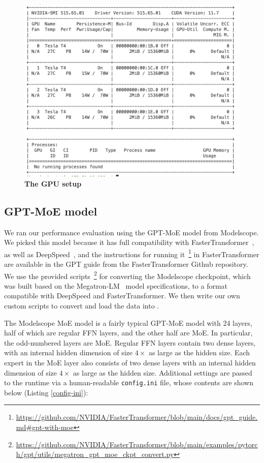 \begin{figure}[H]
    \centering
    \includegraphics[width=\linewidth]{figures/nvidia-smi.png}
    \caption{\textbf{The GPU setup}}
    \label{fig:gpu-setup}
\end{figure}

\subsection{GPT-MoE model}
We ran our performance evaluation using the GPT-MoE model from Modelscope. We picked this model because it has full compatibility with FasterTransformer~\cite{faster_transformer}, as well as DeepSpeed~\cite{deepspeed-moe}, and the instructions for running it~\footnote{\url{https://github.com/NVIDIA/FasterTransformer/blob/main/docs/gpt\_guide.md\#gpt-with-moe}} in FasterTransformer are available in the GPT guide from the FasterTransformer Github repository. We use the provided scripts~\footnote{\url{https://github.com/NVIDIA/FasterTransformer/blob/main/examples/pytorch/gpt/utils/megatron\_gpt\_moe\_ckpt\_convert.py}} for converting the Modelscope checkpoint, which was built based on the Megatron-LM~\cite{megatron-lm} model specifications, to a format compatible with DeepSpeed and FasterTransformer. We then write our own custom scripts to convert and load the data into \Project.

The Modelscope MoE model is a fairly typical GPT-MoE model with 24 layers, half of which are regular FFN layers, and the other half are MoE. In particular, the odd-numbered layers are MoE. Regular FFN layers contain two dense layers, with an internal hidden dimension of size $4 \times$ as large as the hidden size. Each expert in the MoE layer also consists of two dense layers with an internal hidden dimension of size $4 \times$ as large as the hidden size. Additional settings are passed to the runtime via a human-readable \texttt{config.ini} file, whose contents are shown below (Listing \ref{config-ini}):

